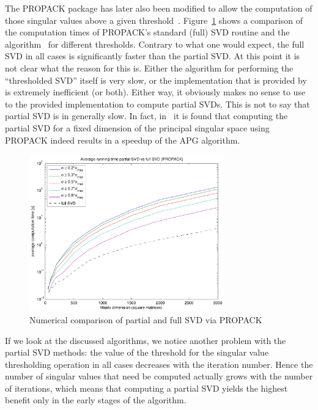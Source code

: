 The PROPACK package has later also been modified to allow the computation of those singular values above a given threshold~\cite{Lin:2011kx}. Figure~\ref{Algorithms:Discussion:SVD:lasvdThrVSlasvd:figure} shows a comparison of the computation times of PROPACK's standard (full) SVD routine and the algorithm~\cite{Lin:2011kx} for different thresholds. Contrary to what one would expect, the full SVD in all cases is significantly faster than the partial SVD. At this point it is not clear what the reason for this is. Either the algorithm for performing the ``thresholded SVD'' itself is very slow, or the implementation that is provided by~\cite{Lin:2011kx} is extremely inefficient (or both). Either way, it obviously makes no sense to use to the provided implementation to compute partial SVDs. This is not to say that partial SVD is in generally slow. In fact, in~\cite{Lin:2010fk} it is found that computing the partial SVD for a fixed dimension of the principal singular space using PROPACK indeed results in a speedup of the APG algorithm. 
%
\begin{figure}[htbp]
\centering
\includegraphics[width=0.75\textwidth]{../figures/thresh_svd_comparison}
\caption{Numerical comparison of partial and full SVD via PROPACK}
\label{Algorithms:Discussion:SVD:lasvdThrVSlasvd:figure}
\end{figure}

If we look at the discussed algorithms, we notice another problem with the partial SVD methods: the value of the threshold for the singular value thresholding operation in all cases decreases with the iteration number. Hence the number of singular values that need be computed actually grows with the number of iterations, which means that computing a partial SVD yields the highest benefit only in the early stages of the algorithm. 



